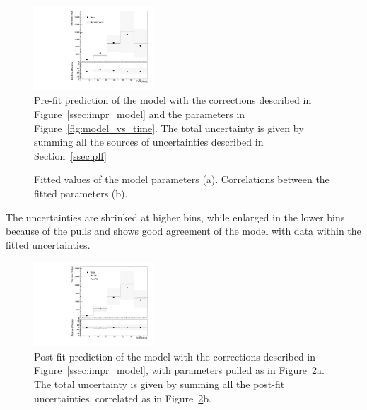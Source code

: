 \begin{figure}
\centering
\includegraphics[width=0.4\textwidth]{imgs/Covid/ModelPrefit.pdf} 
  \caption{Pre-fit prediction of the model with the corrections described in Figure~\ref{ssec:impr_model} and the parameters in Figure~\ref{fig:model_vs_time}. The total uncertainty is given by summing all the sources of uncertainties described in Section~\ref{ssec:plf}}
  \label{fig:prefit}
\end{figure}

\begin{figure}
\centering
{}
  \caption{Fitted values of the model parameters (a). Correlations between the fitted parameters (b).}
  \label{fig:nps}
\end{figure}

The uncertainties are shrinked at higher bins, while enlarged in the lower bins because of the pulls and shows good agreement of the model with data within the fitted uncertainties.

\begin{figure}
\centering
\includegraphics[width=0.4\textwidth]{imgs/Covid/ModelPostFit.pdf} 
  \caption{Post-fit prediction of the model with the corrections described in Figure~\ref{ssec:impr_model}, with parameters pulled as in Figure~\ref{fig:nps}a. The total uncertainty is given by summing all the post-fit uncertainties, correlated as in Figure~\ref{fig:nps}b.}
  \label{fig:postfit}
\end{figure}

